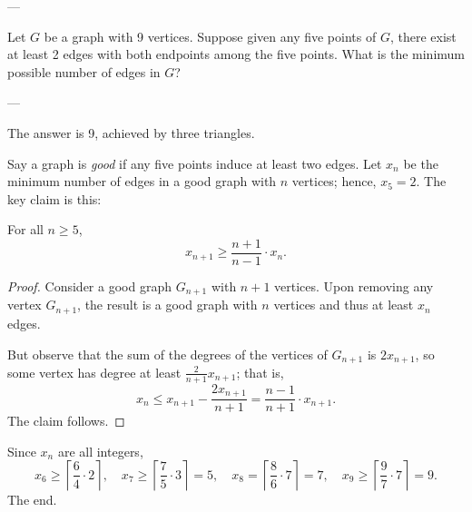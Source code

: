 
---

Let $G$ be a graph with 9 vertices. Suppose given any five points of $G$, there exist at least 2 edges with both endpoints among the five points. What is the minimum possible number of edges in $G$?

---

The answer is 9, achieved by three triangles.

Say a graph is \emph{good} if any five points induce at least two edges. Let $x_n$ be the minimum number of edges in a good graph with $n$ vertices; hence, $x_5=2$. The key claim is this:
\begin{claim*}
    For all $n\ge5$,
    \[x_{n+1}\ge\frac{n+1}{n-1}\cdot x_n.\]
\end{claim*}
\begin{proof}
    Consider a good graph $G_{n+1}$ with $n+1$ vertices. Upon removing any vertex $G_{n+1}$, the result is a good graph with $n$ vertices and thus at least $x_n$ edges.

    But observe that the sum of the degrees of the vertices of $G_{n+1}$ is $2x_{n+1}$, so some vertex has degree at least $\frac2{n+1}x_{n+1}$; that is,
    \[x_n\le x_{n+1}-\frac{2x_{n+1}}{n+1}=\frac{n-1}{n+1}\cdot x_{n+1}.\]
    The claim follows.
\end{proof}

Since $x_n$ are all integers,
\[x_6\ge\left\lceil\frac64\cdot2\right\rceil,\quad x_7\ge\left\lceil\frac75\cdot3\right\rceil=5,\quad x_8=\left\lceil\frac86\cdot7\right\rceil=7,\quad x_9\ge\left\lceil\frac97\cdot7\right\rceil=9.\]
The end.

